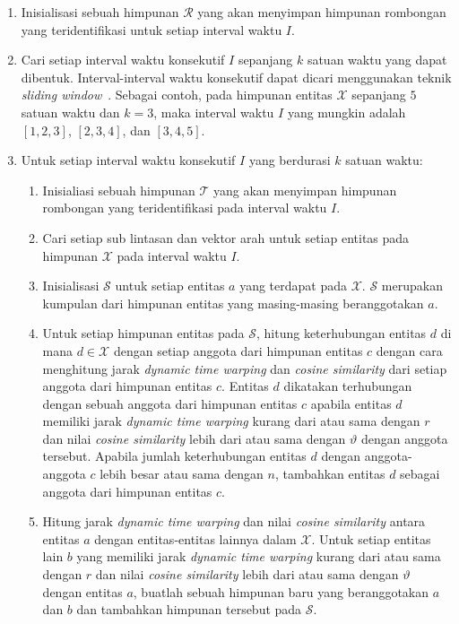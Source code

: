 \begin{enumerate}
    \item Inisialisasi sebuah himpunan $\mathcal{R}$ yang akan menyimpan himpunan rombongan yang teridentifikasi untuk setiap interval waktu $I$.
    \item Cari setiap interval waktu konsekutif $I$ sepanjang $k$ satuan waktu yang dapat dibentuk. Interval-interval waktu konsekutif dapat dicari menggunakan teknik \textit{sliding window}~\cite{ralf:03:sliding-window}. Sebagai contoh, pada himpunan entitas $\mathcal{X}$ sepanjang $5$ satuan waktu dan $k = 3$, maka interval waktu $I$ yang mungkin adalah $[1, 2, 3]$, $[2, 3, 4]$, dan $[3, 4, 5]$.
    \item Untuk setiap interval waktu konsekutif $I$ yang berdurasi $k$ satuan waktu:
    
    \begin{enumerate}
        \item Inisialiasi sebuah himpunan $\mathcal{T}$ yang akan menyimpan himpunan rombongan yang teridentifikasi pada interval waktu $I$.
        \item Cari setiap sub lintasan dan vektor arah untuk setiap entitas pada himpunan $\mathcal{X}$ pada interval waktu $I$.
        \item Inisialisasi $\mathcal{S}$ untuk setiap entitas $a$ yang terdapat pada $\mathcal{X}$. $\mathcal{S}$ merupakan kumpulan dari himpunan entitas yang masing-masing beranggotakan $a$.
        \item Untuk setiap himpunan entitas pada $\mathcal{S}$, hitung keterhubungan entitas $d$ di mana $d \in \mathcal{X}$ dengan setiap anggota dari himpunan entitas $c$ dengan cara menghitung jarak \textit{dynamic time warping} dan \textit{cosine similarity} dari setiap anggota dari himpunan entitas $c$. Entitas $d$ dikatakan terhubungan dengan sebuah anggota dari himpunan entitas $c$ apabila entitas $d$ memiliki jarak \textit{dynamic time warping} kurang dari atau sama dengan $r$ dan nilai \textit{cosine similarity} lebih dari atau sama dengan $\vartheta$ dengan anggota tersebut. Apabila jumlah keterhubungan entitas $d$ dengan anggota-anggota $c$ lebih besar atau sama dengan $n$, tambahkan entitas $d$ sebagai anggota dari himpunan entitas $c$.
        \item Hitung jarak \textit{dynamic time warping} dan nilai  \textit{cosine similarity} antara entitas $a$ dengan entitas-entitas lainnya dalam $\mathcal{X}$. Untuk setiap entitas lain $b$ yang memiliki jarak \textit{dynamic time warping} kurang dari atau sama dengan $r$ dan nilai \textit{cosine similarity} lebih dari atau sama dengan $\vartheta$ dengan entitas $a$, buatlah sebuah himpunan baru yang beranggotakan $a$ dan $b$ dan tambahkan himpunan tersebut pada $\mathcal{S}$.

\end{enumerate}
\end{enumerate}
